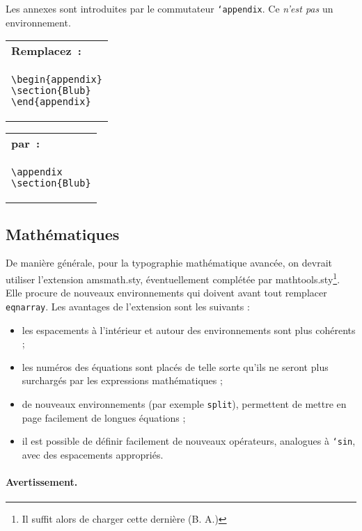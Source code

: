 \documentclass[fontsize=11pt, paper=a4, pagesize, captions=tableheading, numbers=enddot, toc=graduated, footnotes=multiple]{scrartcl}%
\makeatletter
\DeclareRobustCommand*{\Macro}[1]{\mbox{\texttt{\char`\\#1}}}
\newcommand{\Paket}[1]{\textsf{#1.sty}\xspace}
\newenvironment{Ers}[1][\linewidth]{%
  \par\bigskip\noindent\marginline{\textcolor{gruen}{\boldmath $\triangleright$}}\begin{tabular}[t]{@{}p{0.5\textwidth}@{}}\textcolor{rot}{\textbf{\textsf{Remplacez~:}}%
}\\[2pt] \rahmenpr[#1]}%
{\endrahmenpr\end{tabular}}
\newenvironment{Dur}[1][0.5\textwidth]{%
\noindent\begin{tabular}[t]{@{}p{0.5\textwidth - 0.5em}@{}}\textcolor{gruen}{\textbf{\textsf{par~:}}}\\[2pt]\rahmenpg[#1]}%
{\endrahmenpg\end{tabular}\smallskip\noindent}
\makeatother
\begin{document}
Les annexes sont introduites par le commutateur \Macro{appendix}. Ce \emph{n'est pas} un environnement.

\begin{Ers}
\begin{verbatim}
\begin{appendix}
\section{Blub}
\end{appendix}
\end{verbatim}
\end{Ers}
\begin{Dur}
\begin{verbatim}
\appendix
\section{Blub}
\end{verbatim}
\end{Dur}

\subsection{Mathématiques}
\label{sec:mathematiksatz}

De manière générale, pour la typographie mathématique avancée, on devrait utiliser l'extension \Paket{amsmath}, éventuellement complétée par \Paket{mathtools}\footnote{Il suffit alors de charger cette dernière (B. A.)}. Elle procure de nouveaux environnements qui doivent avant tout remplacer \verb+eqnarray+. Les avantages de l'extension sont les suivants :

\begin{itemize}
\item les espacements à l’intérieur et autour des environnements sont plus cohérents ;
\item les numéros des équations sont placés de telle sorte qu'ils ne seront plus surchargés par les expressions mathématiques ;
\item de nouveaux environnements (par exemple \texttt{split}), permettent de mettre en page facilement de longues équations ;
\item il est possible de définir facilement de nouveaux opérateurs, analogues à \Macro{sin}, avec des espacements appropriés.
\end{itemize}

\paragraph{Avertissement.}
\label{sec:warnung}
\end{document}

